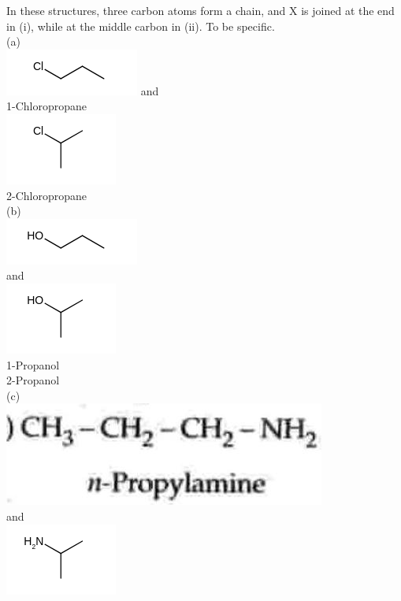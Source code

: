 \documentclass[10pt]{article}
\begin{document}
In these structures, three carbon atoms form a chain, and X is joined at the end in (i), while at the middle carbon in (ii). To be specific.\\
(a)\\
\includegraphics{smile-ede1e4bf005f0db249cf9108365b6fb65c71a09a} and\\
1-Chloropropane\\
\includegraphics{smile-35ab70f968f1c26e89fa2868b926b4bf8b983be5}\\
2-Chloropropane\\
(b)\\
\includegraphics{smile-89c6ba91da6b1c5e90d4affa3834f05912e59d09}\\
and\\
\includegraphics{smile-5300c96c540ffdd897f411bc81dfe6c7bec982d6}\\
1-Propanol\\
2-Propanol\\
(c)\\
\includegraphics[max width=\textwidth, center]{2025_01_28_8470952b98110cec3aabg-040(2)}\\
and\\
\includegraphics{smile-af58f51572fb8bebfcd4081395ff502fad36bf03}
\end{document}
